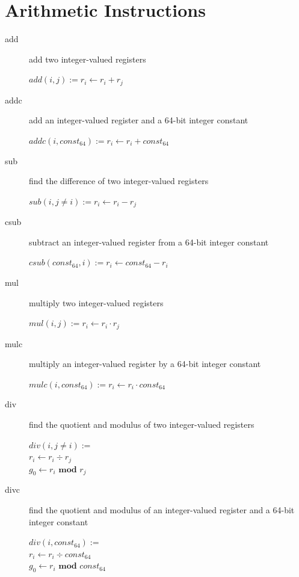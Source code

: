 \documentclass[english,a4paper]{report}
\begin{document}
\section{Arithmetic Instructions}
\begin{description}
	\item[add] add two integer-valued registers
	
	$add(i, j) := r _{i} \longleftarrow  r _{i} + r_{j} $ \\
	
	\item[addc] add an integer-valued register and a 64-bit integer
	constant
	
	$addc(i, const _{64}) := r _{i} \longleftarrow  r _{i} + const 
	_{64} $ \\
	
	\item[sub] find the difference of two integer-valued registers
	
	$sub(i, j\neq i) := r _{i} \longleftarrow  r _{i} - r _{j} $ \\
	
	\item[csub] subtract an integer-valued register from a 64-bit 
	integer
	constant
	
	$csub(const _{64}, i) := r _{i} \longleftarrow const _{64} - r 
	_{i} $ \\
	
	\item[mul] multiply two integer-valued registers
	
	$mul(i, j) := r _{i} \longleftarrow  r _{i} \cdot r _{j} $ \\
	
	\item[mulc] multiply an integer-valued register by a 64-bit 
	integer
	constant
	
	$mulc(i, const _{64}) := r _{i} \longleftarrow r _{i} \cdot const 
	_{64} $
	
	\item[div] find the quotient and modulus of two integer-valued
	registers
	
	$div(i, j\neq i) :=$ \\
	$ r _{i} \longleftarrow  r _{i} \div r _{j}$ \\
	$ g _{0} \longleftarrow  r _{i} \textbf{ mod } r _{j} $\\
	
	\item[divc] find the quotient and modulus of an integer-valued
	register and a 64-bit integer constant
	
	$div(i, const _{64}) :=$ \\
	$ r _{i} \longleftarrow  r _{i} \div const_{64}$ \\
	$ g _{0} \longleftarrow r _{i} \textbf{ mod } const_{64} $
	
\end{description}
\end{document}
